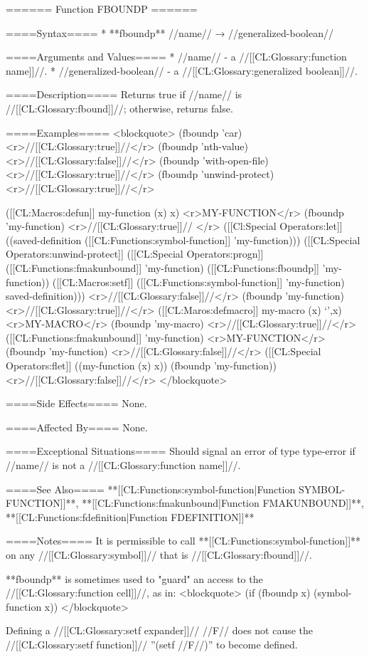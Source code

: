 ====== Function FBOUNDP ======

====Syntax====
  * **fboundp** //name// → //generalized-boolean//

====Arguments and Values====
  * //name// - a //[[CL:Glossary:function name]]//.
  * //generalized-boolean// - a //[[CL:Glossary:generalized boolean]]//.

====Description====
Returns true if //name// is //[[CL:Glossary:fbound]]//; otherwise, returns false.

====Examples====
<blockquote>
(fboundp 'car) <r>//[[CL:Glossary:true]]//</r>
(fboundp 'nth-value) <r>//[[CL:Glossary:false]]//</r>
(fboundp 'with-open-file) <r>//[[CL:Glossary:true]]//</r>
(fboundp 'unwind-protect) <r>//[[CL:Glossary:true]]//</r>

([[CL:Macros:defun]] my-function (x) x) <r>MY-FUNCTION</r>
(fboundp 'my-function) <r>//[[CL:Glossary:true]]// </r>
([[Cl:Special Operators:let]] ((saved-definition ([[CL:Functions:symbol-function]] 'my-function)))
  ([[CL:Special Operators:unwind-protect]]
      ([[CL:Special Operators:progn]]
        ([[CL:Functions:fmakunbound]] 'my-function)
        ([[CL:Functions:fboundp]] 'my-function))
    ([[CL:Macros:setf]] ([[CL:Functions:symbol-function]] 'my-function) saved-definition)))
  <r>//[[CL:Glossary:false]]//</r>
(fboundp 'my-function) <r>//[[CL:Glossary:true]]//</r>
([[CL:Maros:defmacro]] my-macro (x) `',x) <r>MY-MACRO</r>
(fboundp 'my-macro) <r>//[[CL:Glossary:true]]//</r>
([[CL:Functions:fmakunbound]] 'my-function) <r>MY-FUNCTION</r>
(fboundp 'my-function) <r>//[[CL:Glossary:false]]//</r>
([[CL:Special Operators:flet]] ((my-function (x) x)) 
  (fboundp 'my-function)) 
  <r>//[[CL:Glossary:false]]//</r>
</blockquote>

====Side Effects====
None.

====Affected By====
None.

====Exceptional Situations====
Should signal an error of type type-error if //name// is not a //[[CL:Glossary:function name]]//.

====See Also====
**[[CL:Functions:symbol-function|Function SYMBOL-FUNCTION]]**, **[[CL:Functions:fmakunbound|Function FMAKUNBOUND]]**, **[[CL:Functions:fdefinition|Function FDEFINITION]]**

====Notes====
It is permissible to call **[[CL:Functions:symbol-function]]** on any //[[CL:Glossary:symbol]]// that is //[[CL:Glossary:fbound]]//.

**fboundp** is sometimes used to "guard" an access to the //[[CL:Glossary:function cell]]//, as in: 
<blockquote>
(if (fboundp x) (symbol-function x))
</blockquote>

Defining a //[[CL:Glossary:setf expander]]// //F// does not cause the //[[CL:Glossary:setf function]]// ''(setf //F//)'' to become defined.

 
